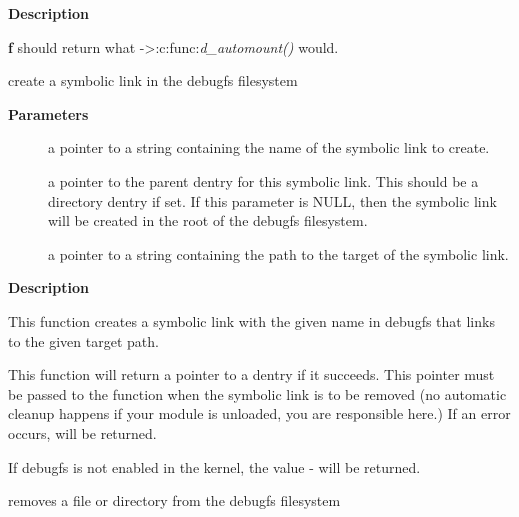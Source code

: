 \documentclass[a4paper,8pt,english]{sphinxmanual}
\begin{document}
\textbf{Description}

\textbf{f} should return what -\textgreater{}:c:func:\emph{d\_automount()} would.

\begin{fulllineitems}
\label{filesystems/index:c.debugfs_create_symlink}
create a symbolic link in the debugfs filesystem

\end{fulllineitems}


\textbf{Parameters}
\begin{description}
\item[{}] \leavevmode
a pointer to a string containing the name of the symbolic link to
create.

\item[{}] \leavevmode
a pointer to the parent dentry for this symbolic link.  This
should be a directory dentry if set.  If this parameter is NULL,
then the symbolic link will be created in the root of the debugfs
filesystem.

\item[{}] \leavevmode
a pointer to a string containing the path to the target of the
symbolic link.

\end{description}

\textbf{Description}

This function creates a symbolic link with the given name in debugfs that
links to the given target path.

This function will return a pointer to a dentry if it succeeds.  This
pointer must be passed to the {\hyperref[filesystems/index:c.debugfs_remove]{\emph{}}} function when the symbolic
link is to be removed (no automatic cleanup happens if your module is
unloaded, you are responsible here.)  If an error occurs,  will be
returned.

If debugfs is not enabled in the kernel, the value - will be
returned.

\begin{fulllineitems}
\label{filesystems/index:c.debugfs_remove}
removes a file or directory from the debugfs filesystem

\end{fulllineitems}
\end{document}
